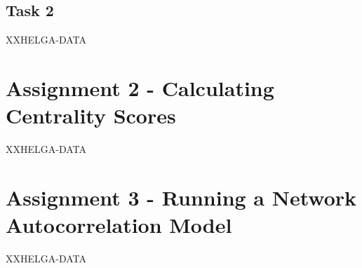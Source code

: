 \documentclass[12pt,a4paper]{article} %
\begin{document}
\subsection{Task 2}

XXHELGA-DATA

% 
\newpage
\section{Assignment 2 - Calculating Centrality Scores}

XXHELGA-DATA

%
\newpage
\section{Assignment 3 - Running a Network Autocorrelation Model}


XXHELGA-DATA











	
\end{document}

